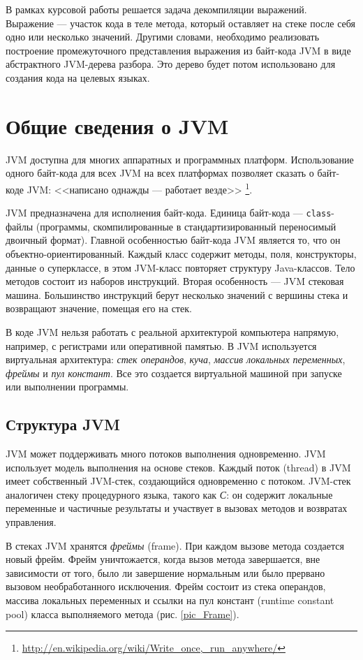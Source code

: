 \documentclass[14pt]{extarticle}
\begin{document}
В рамках курсовой работы решается задача декомпиляции выражений. Выражение --- участок кода в теле метода, который оставляет на стеке после себя одно или несколько значений. Другими словами, необходимо реализовать построение промежуточного представления выражения из байт-кода JVM в виде абстрактного JVM-дерева разбора. Это дерево будет потом использовано для создания кода на целевых языках. 

\pagebreak
\section{Общие сведения о JVM}
JVM доступна для многих аппаратных и программных платформ. Использование одного байт-кода для всех JVM на всех платформах позволяет сказать о байт-коде JVM: <<написано однажды --- работает везде>> \footnote{\url{http://en.wikipedia.org/wiki/Write_once,_run_anywhere/}}.

JVM предназначена для исполнения байт-кода. Единица байт-кода --- \texttt{class}-файлы (программы, скомпилированные в стандартизированный переносимый двоичный формат). Главной особенностью байт-кода JVM является то, что он объектно-ориентированный. Каждый класс содержит методы, поля, конструкторы, данные о суперклассе, в этом JVM-класс повторяет структуру Java-классов. Тело методов состоит из наборов инструкций. Вторая особенность --- JVM стековая машина. Большинство инструкций берут несколько значений с вершины стека и возвращают значение, помещая его на стек.

В коде JVM нельзя работать с реальной архитектурой компьютера напрямую, например, с регистрами или оперативной памятью. В JVM используется виртуальная архитектура: \textit{стек операндов}, \textit{куча}, \textit{массив локальных переменных}, \textit{фреймы} и \textit{пул констант}. Все это создается виртуальной машиной при запуске или выполнении программы.

\subsection{Структура JVM}
JVM может поддерживать много потоков выполнения одновременно. JVM использует модель выполнения на основе стеков. Каждый поток (thread) в JVM имеет собственный JVM-стек, создающийся одновременно с потоком. JVM-стек аналогичен стеку процедурного языка, такого как \textit{С}: он содержит локальные переменные и частичные результаты и участвует в вызовах методов и возвратах управления.  

В стеках JVM хранятся \textit{фреймы} (frame). При каждом вызове метода создается новый фрейм. Фрейм уничтожается, когда вызов метода завершается, вне зависимости от того, было ли завершение нормальным или было прервано вызовом необработанного исключения. Фрейм состоит из стека операндов, массива локальных переменных и ссылки на пул констант (runtime constant pool) класса выполняемого метода (рис. \ref{pic_Frame}). 
\end{document}
